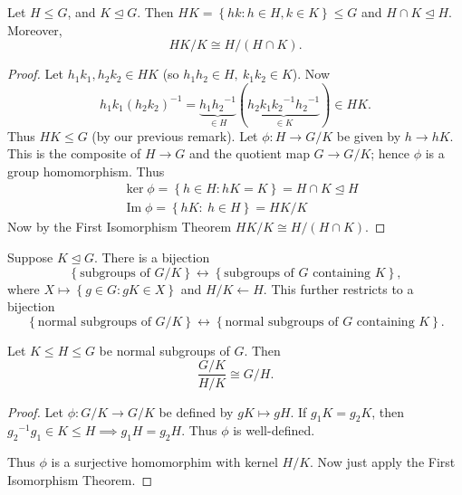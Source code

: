 \documentclass[egregdoesnotlikesansseriftitles,a4paper]{scrartcl}
\begin{document}
\begin{theorem}
      Let $H \leq G$, and $K \unlhd G$. Then $HK = \left\{hk: h \in H, k \in K\right\} \leq G$ and $H \cap K \unlhd H$. Moreover, \[
      HK/K \cong H/(H \cap K)
      .\]
      \begin{proof}
            Let $h_1 k_1 , h_2 k_2 \in HK$ (so $h_1 h_2 \in H, \ k_1 k_2 \in K$). Now \[
            h_1 k_1 {(h_2 k_2 )}^{-1}=\underbrace{h_1 {h_2 }^{-1}}_{\in H} (\underbrace{h_2 k_1 {k_2 }^{-1} {h_2 }^{-1}}_{\in K} )\in HK 
            .\] 
           Thus $HK \leq G$ (by our previous remark). Let $\phi: H \rightarrow G/K$ be given by $h \rightarrow hK$. This is the composite of $H \rightarrow G$ and the quotient map $G \rightarrow G/K$; hence $\phi$ is a group homomorphism. Thus
           \begin{align*}
                &\operatorname{ker} \phi = \left\{h \in H: hK=K\right\}=H \cap K \unlhd H \\
                &\operatorname{Im} \phi = \left\{hK: \ h \in H\right\}=HK/K
           \end{align*}
           Now by the First Isomorphism Theorem $HK/K \cong H/(H \cap K)$.
      \end{proof}
\end{theorem}
\begin{lemma}\label{1p2}
      Suppose $K \unlhd G$. There is a bijection \[
      \left\{\text{subgroups of }G/K\right\} \leftrightarrow \left\{\text{subgroups of }G \text{ containing }K\right\}
      ,\] 
     where $X \mapsto \left\{g \in G: gK \in X\right\}$ and $H/K \leftarrow H$. This further restricts to a bijection 
     \[
      \left\{\text{normal subgroups of }G/K\right\} \leftrightarrow \left\{\text{normal subgroups of }G \text{ containing }K\right\}
      .\] 
\end{lemma}
\begin{theorem}
      Let $K \leq H \leq G$ be normal subgroups of $G$. Then \[
      \frac{G/K}{H/K} \cong G/H
      .\] 
      \begin{proof}
            Let $\phi: G/K \rightarrow G/K$ be defined by $gK \mapsto gH$. If $g_1 K= g_2 K$, then ${g_2 }^{-1}g_1 \in K \leq H \implies  g_1 H= g_2 H$. Thus $\phi$ is well-defined.
            
            Thus $\phi$ is a surjective homomorphim with kernel $H/K$. Now just apply the First Isomorphism Theorem.
      \end{proof}
\end{theorem}
\end{document}
